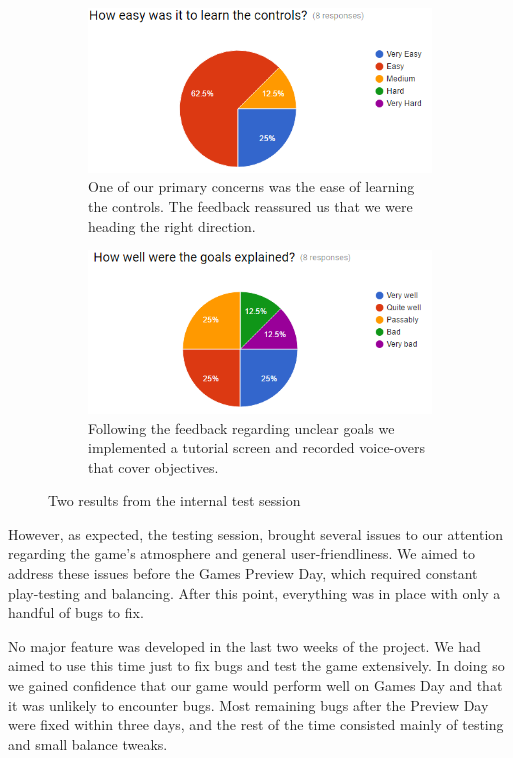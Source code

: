 \documentclass[a4paper,11pt]{article}
\begin{document}
\begin{figure}[ht]
	\centering
    \begin{subfigure}[b]{0.45\textwidth}
    	\centering
    	\includegraphics[scale=0.45]{control_feedback}
    	\caption{One of our primary concerns was the ease of learning the controls. The feedback reassured us that we were heading the right direction.}
    \end{subfigure}
    \begin{subfigure}[b]{0.45\textwidth}
    	\centering
    	\includegraphics[scale=0.45]{goal_feedback}
    	\caption{Following the feedback regarding unclear goals we implemented a tutorial screen and recorded voice-overs that cover objectives.}
    \end{subfigure}
    \caption{Two results from the internal test session}
\end{figure}

However, as expected, the testing session, brought several issues to our attention regarding the game’s atmosphere and general user-friendliness. We aimed to address these issues before the Games Preview Day, which required constant play-testing and balancing. After this point, everything was in place with only a handful of bugs to fix.

No major feature was developed in the last two weeks of the project. We had aimed to use this time just to fix bugs and test the game extensively. In doing so we gained confidence that our game would perform well on Games Day and that it was unlikely to encounter bugs. Most remaining bugs after the Preview Day were fixed within three days, and the rest of the time consisted mainly of testing and small balance tweaks.
\end{document}
